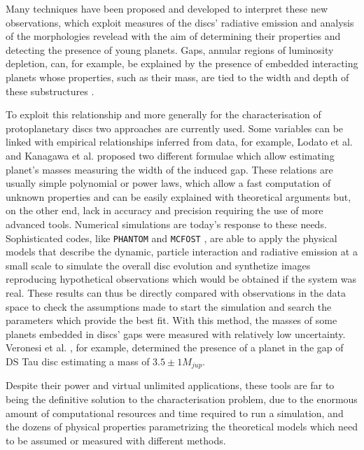 \documentclass[a4paper,10pt]{report}
\begin{document}
Many techniques have been proposed and developed to interpret these new observations,
which exploit measures of the discs' radiative emission and analysis of the morphologies revelead
with the aim of determining their properties and detecting the presence of young planets.
Gaps, annular regions of luminosity depletion, can, for example, be explained 
by the presence of embedded interacting planets whose properties, such as their mass, are
tied to the width and depth of these substructures \cite{gap_opening1,gap_opening2,gap_opening3}.

To exploit this relationship and more generally for the characterisation of protoplanetary discs
two approaches are currently used. Some variables can be linked with empirical relationships 
inferred from data,
for example, Lodato et al. \cite{Lodato_2019} and Kanagawa et al. \cite{kanagawa} proposed 
two different formulae which allow estimating planet's masses measuring
the width of the induced gap. These relations are usually simple polynomial or power laws, which 
allow a fast computation of unknown properties and can be easily explained with theoretical
arguments but, on the other end,
lack in accuracy and precision requiring the use of more advanced tools.
Numerical simulations are today's response to these needs. Sophisticated codes,
 like \lstinline{PHANTOM} \cite{phantom} and \lstinline{MCFOST} \cite{mcfost1,mcfost2}, 
are able to apply the physical models that describe the dynamic, particle interaction and radiative emission at a small scale 
to simulate the overall disc evolution and synthetize images reproducing hypothetical observations which would be 
obtained if the system was real.
These results can thus be directly compared  with observations in the data 
space to check the assumptions made to start the simulation and 
search the parameters which provide the best fit. With this method, the masses of some planets embedded 
in discs' gaps were measured with relatively low uncertainty. Veronesi et al. \cite{dstauv}, for example, determined the
presence of a planet in the gap of DS Tau disc estimating a mass of $3.5 \pm 1 M_{jup}$.

Despite their power and virtual unlimited applications, these tools are far to being the definitive solution
to the characterisation problem, due to the enormous amount of computational resources and time 
required to run a simulation, and the dozens of physical properties parametrizing the theoretical models which need to be 
assumed or measured with different methods.
\end{document}
